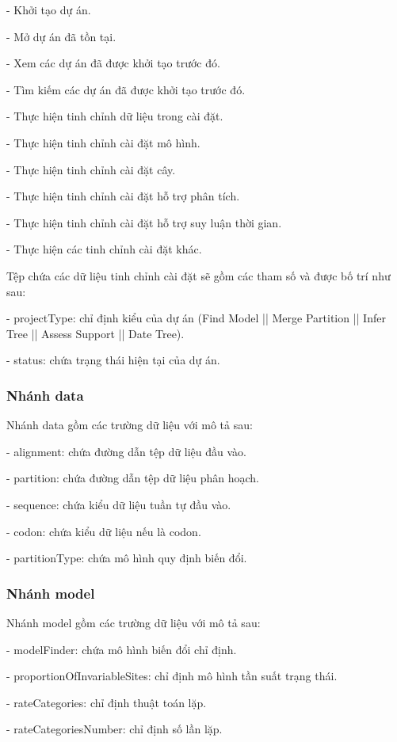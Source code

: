 \documentclass[12pt]{report}
\begin{document}
- Khởi tạo dự án.

- Mở dự án đã tồn tại.

- Xem các dự án đã được khởi tạo trước đó.

- Tìm kiếm các dự án đã được khởi tạo trước đó.

- Thực hiện tinh chỉnh dữ liệu trong cài đặt.

- Thực hiện tinh chỉnh cài đặt mô hình.

- Thực hiện tinh chỉnh cài đặt cây.

- Thực hiện tinh chỉnh cài đặt hỗ trợ phân tích.

- Thực hiện tinh chỉnh cài đặt hỗ trợ suy luận thời gian.

- Thực hiện các tinh chỉnh cài đặt khác.

Tệp chứa các dữ liệu tinh chỉnh cài đặt sẽ gồm các tham số và được bố trí như sau:

- projectType: chỉ định kiểu của dự án (Find Model || Merge Partition || Infer Tree || Assess Support || Date Tree).

- status: chứa trạng thái hiện tại của dự án.

\subsubsection{Nhánh data} 
    Nhánh data gồm các trường dữ liệu với mô tả sau:
    
    - alignment: chứa đường dẫn tệp dữ liệu đầu vào.
    
    - partition: chứa đường dẫn tệp dữ liệu phân hoạch.
    
    - sequence: chứa kiểu dữ liệu tuần tự đầu vào.
    
    - codon: chứa kiểu dữ liệu nếu là codon.
    
    - partitionType: chứa mô hình quy định biến đổi.
  
\subsubsection{Nhánh model}
    Nhánh model gồm các trường dữ liệu với mô tả sau:
    
    - modelFinder: chứa mô hình biến đổi chỉ định. 
    
    - proportionOfInvariableSites: chỉ định mô hình tần suất trạng thái.
    
    - rateCategories: chỉ định thuật toán lặp.
    
    - rateCategoriesNumber: chỉ định số lần lặp.
    
\end{document}
